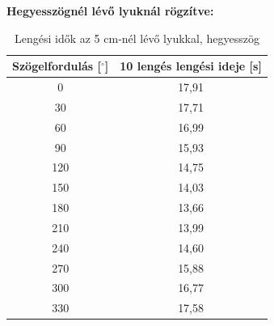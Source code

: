 \documentclass{article}
\begin{document}
\vspace{0.5em}
\noindent
\textbf{Hegyesszögnél lévő lyuknál rögzítve:}
\begin{table}[H]
    \centering
    \begin{tabular}{|c|c|}
        \hline
        Szögelfordulás [$^\circ$] & 10 lengés lengési ideje [s] \\ \hline
        0                         & 17,91                       \\ \hline 
        30                        & 17,71                       \\ \hline
        60                        & 16,99                       \\ \hline 
        90                        & 15,93                       \\ \hline
        120                       & 14,75                       \\ \hline 
        150                       & 14,03                       \\ \hline
        180                       & 13,66                       \\ \hline
        210                       & 13,99                       \\ \hline
        240                       & 14,60                       \\ \hline
        270                       & 15,88                       \\ \hline
        300                       & 16,77                       \\ \hline
        330                       & 17,58                       \\ \hline
    \end{tabular}
    \caption{Lengési idők az 5 cm-nél lévő lyukkal, hegyesszög}
    \label{tab:lengesiido_1.1}
\end{table}
\end{document}
